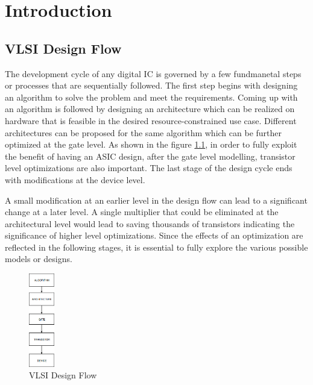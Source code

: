 \chapter{Introduction}
\label{chap:intro}
\section{VLSI Design Flow}
The development cycle of any digital IC is governed by a few fundmanetal steps or processes that are sequentially followed. The first step begins with designing an algorithm to solve the problem and meet the requirements. Coming up with an algorithm is followed by designing an architecture which can be realized on hardware that is feasible in the desired resource-constrained use case. Different architectures can be proposed for the same algorithm which can be further optimized at the gate level. As shown in the figure \ref{fig:vlsi}, in order to fully exploit the benefit of having an ASIC design, after the gate level modelling, transistor level optimizations are also important. The last stage of the design cycle ends with modifications at the device level.

A small modification at an earlier level in the design flow can lead to a significant change at a later level. A single multiplier that could be eliminated at the architectural level would lead to saving thousands of transistors indicating the significance of higher level optimizations. Since the effects of an optimization are reflected in the following stages, it is essential to fully explore the various possible models or designs.

\begin{figure}[h]
\label{fig:vlsi}
	\caption{VLSI Design Flow}    
    \centering
    \includegraphics[width=0.1\textwidth]{vlsi_dESIGN}
\end{figure}

